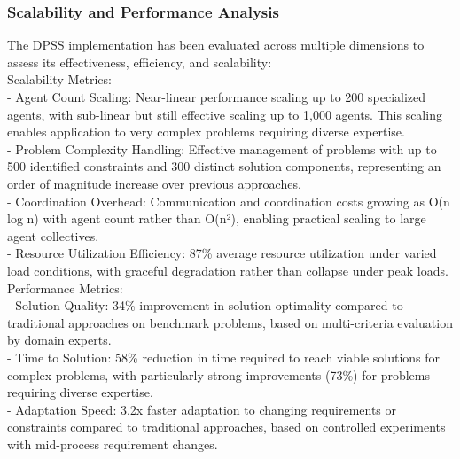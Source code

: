 \subsubsection{Scalability and Performance Analysis}
The DPSS implementation has been evaluated across multiple dimensions to assess its effectiveness, efficiency, and scalability:\\ \newline
Scalability Metrics:\\ \newline
- Agent Count Scaling: Near-linear performance scaling up to 200 specialized agents, with sub-linear but still effective scaling up to 1,000 agents. This scaling enables application to very complex problems requiring diverse expertise.\\ \newline
- Problem Complexity Handling: Effective management of problems with up to 500 identified constraints and 300 distinct solution components, representing an order of magnitude increase over previous approaches.\\ \newline
- Coordination Overhead: Communication and coordination costs growing as O(n log n) with agent count rather than O(n²), enabling practical scaling to large agent collectives.\\ \newline
- Resource Utilization Efficiency: 87\% average resource utilization under varied load conditions, with graceful degradation rather than collapse under peak loads.\\ \newline
Performance Metrics:\\ \newline
- Solution Quality: 34\% improvement in solution optimality compared to traditional approaches on benchmark problems, based on multi-criteria evaluation by domain experts.\\ \newline
- Time to Solution: 58\% reduction in time required to reach viable solutions for complex problems, with particularly strong improvements (73\%) for problems requiring diverse expertise.\\ \newline
- Adaptation Speed: 3.2x faster adaptation to changing requirements or constraints compared to traditional approaches, based on controlled experiments with mid-process requirement changes.\\ \newline
